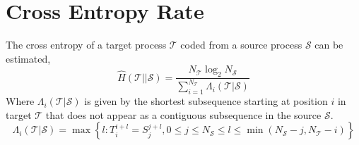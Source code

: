 

\section{Cross Entropy Rate}



\begin{definition}
	The cross entropy of a {\color{target} target process} $\mathcal{T}$ coded from a {\color{source} source process} $\mathcal{S}$ can be estimated,
	\begin{equation}
	\hat{H}(\mathcal{T} || \mathcal{S})=\frac{N_{\mathcal{T}} \log _{2} N_{\mathcal{S}}}{\sum_{i=1}^{N_{\mathcal{T}}} \Lambda_{i}(\mathcal{T}| \mathcal{S})}
	\end{equation}
	Where $\Lambda_{i}(\mathcal{T}| \mathcal{S})$ is given by the shortest subsequence starting at position $i$ in {\color{target}target} $\mathcal{T}$ that does not appear as a contiguous subsequence in the {\color{source}source} $\mathcal{S}$.
	\begin{equation}
	\Lambda_{i}(\mathcal{T}| \mathcal{S}) = \max \left\{l: T_i^{i+l}=S_{j}^{j+l}, 0 \leq j \leq N_{\mathcal{S}} \leq l \leq \min( N_{\mathcal{S}}- j , N_{\mathcal{T}}- i )\right\}
	\end{equation}
\end{definition}




